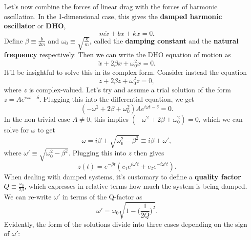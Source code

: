 \documentclass[
  letterpaper,
  DIV=11,
  numbers=noendperiod]{scrreprt}
\begin{document}
Let's now combine the forces of linear drag with the forces of harmonic
oscillation. In the 1-dimensional case, this gives the \textbf{damped
harmonic oscillator} or \textbf{DHO}, \[
m \ddot x + bx + kx = 0.
\] Define \(\beta \equiv \frac{b}{2m}\) and
\(\omega_0 \equiv \sqrt{\frac{k}{m}}\), called the \textbf{damping
constant} and the \textbf{natural frequency} respectively. Then we can
write the DHO equation of motion as \[
\ddot x + 2\beta x + \omega_0^2 x = 0.
\] It'll be insightful to solve this in its complex form. Consider
instead the equation \[
\ddot z + 2\beta z + \omega_0^2 z = 0,
\] where \(z\) is complex-valued. Let's try and assume a trial solution
of the form \(z = A e^{i\omega t - \delta}\). Plugging this into the
differential equation, we get \[
(-\omega^2 + 2\beta + \omega_0^2)A e^{i\omega t - \delta} = 0.
\] In the non-trivial case \(A \neq 0\), this implies
\((-\omega^2 + 2\beta + \omega_0^2) = 0\), which we can solve for
\(\omega\) to get \[
\omega = i\beta \pm \sqrt{\omega_0^2 - \beta^2} \equiv i\beta \pm \omega',
\] where \(\omega' \equiv \sqrt{\omega_0^2 - \beta^2}\). Plugging this
into \(z\) then gives \[
z(t) = e^{-\beta t}(c_1 e^{i\omega' t} + c_2 e^{-i\omega' t}).
\] When dealing with damped systems, it's customary to define a
\textbf{quality factor} \(Q \equiv \frac{\omega_0}{2\beta}\), which
expresses in relative terms how much the system is being damped. We can
re-write \(\omega'\) in terms of the Q-factor as \[
\omega' = \omega_0 \sqrt{1 - \bigg(\frac{1}{2Q}\bigg)^2}.
\] Evidently, the form of the solutions divide into three cases
depending on the sign of \(\omega'\):
\end{document}
